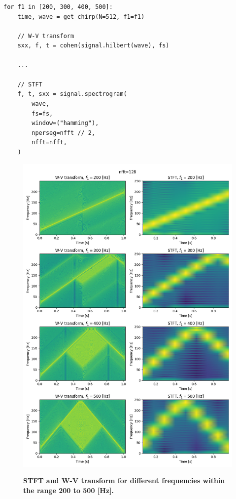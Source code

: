 \documentclass[13pt,a4paper]{article}
\begin{document}
\begin{lstlisting}[caption={\textbf{Snippet for generating the STFT and W-V transform for different frequencies within specified range.}}]
for f1 in [200, 300, 400, 500]:
    time, wave = get_chirp(N=512, f1=f1)

    // W-V transform
    sxx, f, t = cohen(signal.hilbert(wave), fs)

    ...

    // STFT
    f, t, sxx = signal.spectrogram(
        wave,
        fs=fs,
        window=("hamming"),
        nperseg=nfft // 2,
        nfft=nfft,
    )
\end{lstlisting}

\begin{figure}[ht!]
    \centering
    \caption{\textbf{STFT and W-V transform for different frequencies within the range 200 to 500 [Hz].}}
    \includegraphics[width=\linewidth]{stft_f1s.png}
    \label{fig:stft_f1s}
\end{figure}
\clearpage
\end{document}
